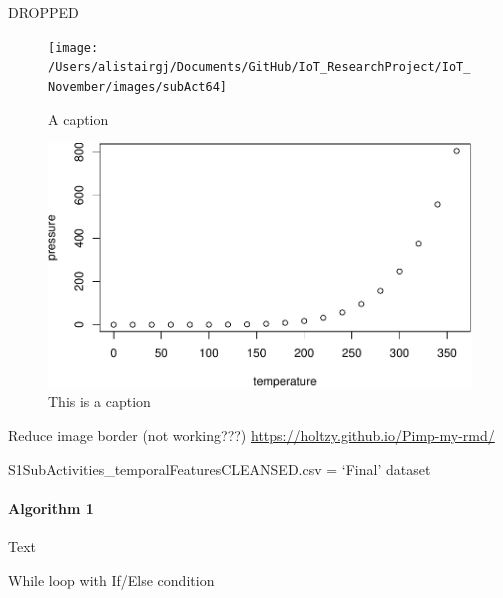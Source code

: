 \documentclass[11pt,]{article}
\let\oldparagraph\paragraph
\renewcommand{\paragraph}[1]{\oldparagraph{#1}\mbox{}}
\begin{document}
DROPPED

\begin{figure}[H]

{\centering \texttt{[image: /Users/alistairgj/Documents/GitHub/IoT\_ResearchProject/IoT\_November/images/subAct64]} 

}

\caption{A caption}\label{fig:subAct64}
\end{figure}

\begin{figure}[H]

{\centering \includegraphics{MD_Final_files/figure-latex/fig1-1} 

}

\caption{\label{fig:fig1}This is a caption}\label{fig:fig1}
\end{figure}

Reduce image border (not working???)
\url{https://holtzy.github.io/Pimp-my-rmd/}

S1SubActivities\_temporalFeaturesCLEANSED.csv = `Final' dataset

\hypertarget{algorithm-1}{%
\paragraph{Algorithm 1}\label{algorithm-1}}

Text

\begin{algorithm}[H]
\DontPrintSemicolon
\SetAlgoLined
{}
\BlankLine
{}
\caption{While loop with If/Else condition}
\end{algorithm}
\end{document}
